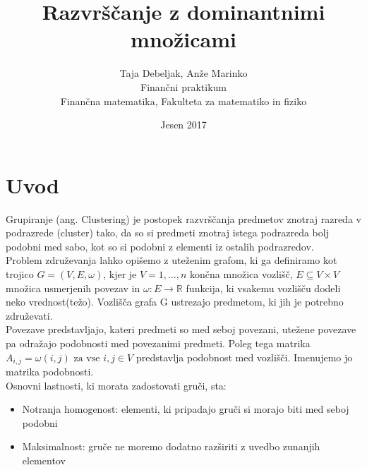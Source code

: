 \documentclass[a4paper]{article}
\title{Razvrščanje z dominantnimi množicami}
\author{Taja Debeljak, Anže Marinko \\ Finančni praktikum \\ Finančna matematika, Fakulteta za matematiko in fiziko}
\date{Jesen 2017}
\begin{document}
\maketitle
\section{Uvod}
Grupiranje (ang. Clustering) je postopek razvrščanja predmetov znotraj razreda v podrazrede (cluster) tako, da so si predmeti znotraj istega podrazreda bolj podobni med sabo, kot so si podobni z elementi iz ostalih podrazredov. \\
Problem združevanja lahko opišemo z uteženim grafom, ki ga definiramo kot trojico $G = (V,E,\omega)$, kjer je $V = {1,\ldots,n}$ končna množica vozlišč, $E \subseteq V \times V$ množica usmerjenih
povezav in $\omega: E \rightarrow \mathbb{R}$ funkcija, ki vsakemu vozlišču dodeli neko vrednost(težo). Vozlišča grafa G ustrezajo predmetom, ki jih je potrebno združevati. \\
Povezave predstavljajo, kateri predmeti so med seboj povezani, utežene povezave pa odražajo podobnosti med povezanimi predmeti. Poleg tega matrika $A_{i,j} = \omega(i,j) \text{ za vse } i, j \in V$ predstavlja podobnost med vozlišči. Imenujemo jo matrika podobnosti. \\
Osnovni lastnosti, ki morata zadostovati gruči, sta:
\begin{itemize}
\item Notranja homogenost: elementi, ki pripadajo gruči si morajo biti med seboj podobni
\item Maksimalnost: gruče ne moremo dodatno razširiti z uvedbo zunanjih elementov
\end{itemize}
\end{document}
